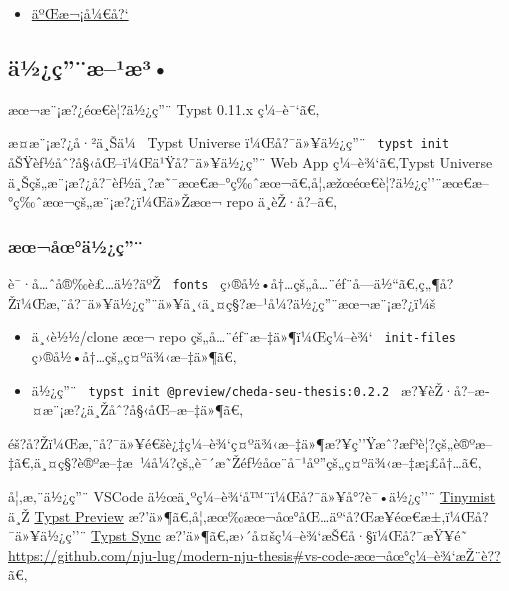\begin{itemize}
\begin{itemize}
    \begin{itemize}
    \tightlist
    \item
      \href{https://github.com/typst/packages/raw/main/packages/preview/cheda-seu-thesis/0.3.0/\#\%E4\%BA\%8C\%E6\%AC\%A1\%E5\%BC\%80\%E5\%8F\%91}{äºŒæ¬¡å¼€å?{}`}
    \end{itemize}
  \end{itemize}
\end{itemize}

\subsection{ä½¿ç''¨æ--¹æ³•}\label{uxe4uxbduxe7uxe6uxb9uxe6uxb3}

æœ¬æ¨¡æ?¿éœ€è¦?ä½¿ç''¨ Typst 0.11.x ç¼--è¯`ã€‚

æ­¤æ¨¡æ?¿å·²ä¸Šä¼~ Typst Universe ï¼Œå?¯ä»¥ä½¿ç''¨
\texttt{\ typst\ init\ } åŠŸèƒ½åˆ?å§‹åŒ--ï¼Œä¹Ÿå?¯ä»¥ä½¿ç''¨ Web App
ç¼--è¾`ã€‚Typst Universe
ä¸Šçš„æ¨¡æ?¿å?¯èƒ½ä¸?æ˜¯æœ€æ--°ç‰ˆæœ¬ã€‚å¦‚æžœéœ€è¦?ä½¿ç''¨æœ€æ--°ç‰ˆæœ¬çš„æ¨¡æ?¿ï¼Œä»Žæœ¬
repo ä¸­èŽ·å?--ã€‚

\subsubsection{æœ¬åœ°ä½¿ç''¨}\label{uxe6ux153uxe5ux153uxe4uxbduxe7}

è¯·å\ldots ˆå®‰è£\ldots ä½?äºŽ \texttt{\ fonts\ }
ç›®å½•å†\ldots çš„å\ldots¨éƒ¨å­---ä½``ã€‚ç„¶å?Žï¼Œæ‚¨å?¯ä»¥ä½¿ç''¨ä»¥ä¸‹ä¸¤ç§?æ--¹å¼?ä½¿ç''¨æœ¬æ¨¡æ?¿ï¼š

\begin{itemize}
\tightlist
\item
  ä¸‹è½½/clone æœ¬ repo çš„å\ldots¨éƒ¨æ--‡ä»¶ï¼Œç¼--è¾`
  \texttt{\ init-files\ } ç›®å½•å†\ldots çš„ç¤ºä¾‹æ--‡ä»¶ã€‚
\item
  ä½¿ç''¨ \texttt{\ typst\ init\ @preview/cheda-seu-thesis:0.2.2\ }
  æ?¥èŽ·å?--æ­¤æ¨¡æ?¿ä¸Žåˆ?å§‹åŒ--æ--‡ä»¶ã€‚
\end{itemize}

éš?å?Žï¼Œæ‚¨å?¯ä»¥é€šè¿‡ç¼--è¾`ç¤ºä¾‹æ--‡ä»¶æ?¥ç''Ÿæˆ?æƒ³è¦?çš„è®ºæ--‡ã€‚ä¸¤ç§?è®ºæ--‡æ~¼å¼?çš„è¯´æ˜Žéƒ½åœ¨å¯¹åº''çš„ç¤ºä¾‹æ--‡æ¡£å†\ldots ã€‚

å¦‚æ‚¨ä½¿ç''¨ VSCode ä½œä¸ºç¼--è¾`å™¨ï¼Œå?¯ä»¥å°?è¯•ä½¿ç''¨
\href{https://marketplace.visualstudio.com/items?itemName=nvarner.typst-lsp}{Tinymist}
ä¸Ž
\href{https://marketplace.visualstudio.com/items?itemName=mgt19937.typst-preview}{Typst
Preview} æ?'ä»¶ã€‚å¦‚æœ‰æœ¬åœ°åŒ\ldots äº`å?Œæ­¥éœ€æ±‚ï¼Œå?¯ä»¥ä½¿ç''¨
\href{https://marketplace.visualstudio.com/items?itemName=OrangeX4.vscode-typst-sync}{Typst
Sync} æ?'ä»¶ã€‚æ›´å¤šç¼--è¾`æŠ€å·§ï¼Œå?¯æŸ¥é˜
\href{https://github.com/nju-lug/modern-nju-thesis\#vs-code-\%E6\%9C\%AC\%E5\%9C\%B0\%E7\%BC\%96\%E8\%BE\%91\%E6\%8E\%A8\%E8\%8D\%90}{https://github.com/nju-lug/modern-nju-thesis\#vs-code-æœ¬åœ°ç¼--è¾`æŽ¨è??}
ã€‚

